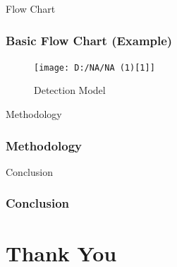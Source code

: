 \documentclass[aspectratio=1610]{beamer}
\begin{document}
\begin{frame}{Flow Chart}
    \frametitle{Basic Flow Chart (Example)}
        \begin{figure}
        \centering
        \texttt{[image: D:/NA/NA (1)[1]]}
        \caption{Detection Model}
        \label{fig:enter-label}
    \end{figure}
      
    
\end{frame}

\begin{frame}{Methodology}
    \frametitle{Methodology}


\end{frame}


\begin{frame}{Conclusion}
    \frametitle{Conclusion}
    
\end{frame}

\section{Thank You}
\end{document}
